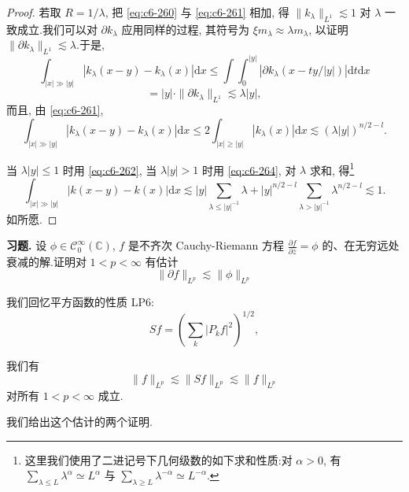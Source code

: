 \begin{proof}
若取 $R = 1/\lambda$, 把 \eqref{eq:c6-260} 与 \eqref{eq:c6-261} 相加, 得 $\|k_\lambda\|_{L^1} \lesssim 1$ 对 $\lambda$ 一致成立.我们可以对 $\partial k_\lambda$ 应用同样的过程, 其符号为 $\xi m_\lambda \approx \lambda m_\lambda$, 以证明 $\|\partial k_\lambda\|_{L^1} \lesssim \lambda$.于是,
\begin{equation}
\int_{|x| \gg |y|} |k_\lambda(x-y) - k_\lambda(x)| \mathrm{d}x \leq \int \int_0^{|y|} |\partial k_\lambda (x - t y/|y|)| \mathrm{d}t \mathrm{d}x\label{eq:c6-262}
\end{equation}
\begin{equation}
= |y| \cdot \|\partial k_\lambda\|_{L^1} \lesssim \lambda |y|, \label{eq:c6-263}
\end{equation}
而且, 由 \eqref{eq:c6-261},
\begin{equation}
\int_{|x| \gg |y|} |k_\lambda(x-y) - k_\lambda(x)| \mathrm{d}x \leq 2 \int_{|x| \geq |y|} |k_\lambda(x)| \mathrm{d}x \lesssim (\lambda |y|)^{n/2 - l}.\label{eq:c6-264}
\end{equation}

当 $\lambda |y| \leq 1$ 时用 \eqref{eq:c6-262}, 当 $\lambda |y| > 1$ 时用 \eqref{eq:c6-264}, 对 $\lambda$ 求和, 得\footnote{这里我们使用了二进记号下几何级数的如下求和性质:对 $\alpha > 0$, 有 $\sum_{\lambda \leq L} \lambda^\alpha \simeq L^\alpha$ 与 $\sum_{\lambda \geq L} \lambda^{-\alpha} \simeq L^{-\alpha}$.}
\[
\int_{|x| \gg |y|} |k(x-y) - k(x)| \mathrm{d}x \lesssim |y| \sum_{\lambda \leq |y|^{-1}} \lambda + |y|^{n/2 - l} \sum_{\lambda > |y|^{-1}} \lambda^{n/2 - l} \lesssim 1.
\]
如所愿.
\end{proof}

\textbf{习题.} 设 $\phi \in \mathcal{C}_0^\infty(\mathbb{C})$, $f$ 是不齐次 Cauchy-Riemann 方程 $\frac{\partial f}{\partial \bar{z}} = \phi$ 的、在无穷远处衰减的解.证明对 $1 < p < \infty$ 有估计
\[
\|\partial f\|_{L^p} \lesssim \|\phi\|_{L^p}
\]


我们回忆平方函数的性质 LP6:
\[
Sf = \left(\sum_k |P_k f|^2\right)^{1/2},
\]

\begin{theorem}\label{thm:c6-6.13}
我们有
\begin{equation}
\|f\|_{L^p} \lesssim \|Sf\|_{L^p} \lesssim \|f\|_{L^p}\label{eq:c6-265}
\end{equation}
对所有 $1 < p < \infty$ 成立.
\end{theorem}

我们给出这个估计的两个证明.

